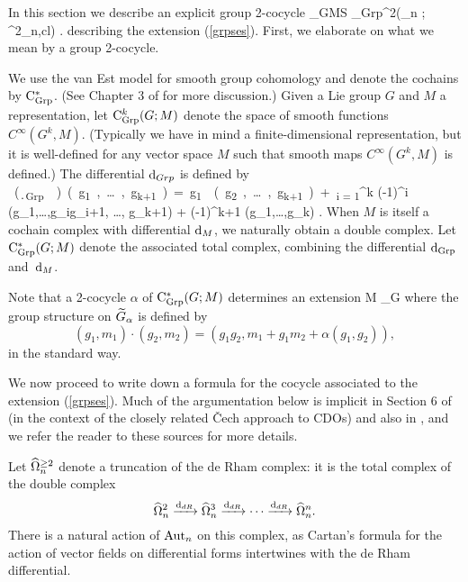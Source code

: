 
In this section we describe an explicit group 2-cocycle
\ben
\Tilde{\alpha}_{GMS} _{\rm Grp}^2(\Aut_n ; \hOmega^2_{n,cl}) .
\een
describing the extension (\ref{grpses}). First, we elaborate on what
we mean by a group 2-cocycle. 

We use the van Est model for smooth group cohomology and denote the cochains by ${\rm C}_{\rm Grp}^*$.
(See Chapter 3 of \cite{Fuks} for more discussion.) 
Given a Lie group $G$ and $M$ a representation,
let ${\rm C}_{\rm Grp}^k(G ; M)$ denote the space of smooth functions $C^\infty(G^k,M)$.
(Typically we have in mind a finite-dimensional representation,
but it is well-defined for any vector space $M$ such that smooth maps $C^\infty(G^k,M)$ is defined.)
The differential $\d_{Grp}$ is defined by
\si
\ben
(\d_{\rm Grp} \alpha)(g_1,\ldots, g_{k+1}) = 
g_1 \alpha(g_2, \ldots, g_{k+1}) + 
\sum_{i = 1}^{k} (-1)^i \alpha(g_1,\ldots,g_{i}g_{i+1}, \ldots, g_{k+1}) +
(-1)^{k+1} \alpha(g_1,\ldots,g_k) .
\een 
When $M$ is itself a cochain complex with differential $\d_M$, 
we naturally obtain a double complex.
Let ${\rm C}_{\rm Grp}^*(G; M)$ denote the associated total complex, combining the differential $\d_{\rm Grp}$ and~$\d_M$. 

Note that  a 2-cocycle $\alpha$ of ${\rm C}_{\rm Grp}^*(G; M)$ determines an extension
 \to M \to {}_\alpha \to G 
\een
where the group structure on $\Tilde{G}_\alpha$ is defined by
\[
(g_1, m_1) \cdot (g_2, m_2) = (g_1 g_2, m_1 + g_1m_2 + \alpha(g_1,g_2)),
\]
in the standard way.

We now proceed to write down a formula for the cocycle associated to the extension (\ref{grpses}). 
Much of the argumentation below is implicit in Section 6 of \cite{GMS2} (in the context of the closely related
\v{C}ech approach to CDOs) and also in \cite{GMS}, and we refer the reader to these sources for more details.  

Let $\hOmega^{\geq 2}_n$ denote a truncation of the de Rham complex: it is the total complex of the double complex
\[
\hOmega^{2}_n \xto{\d_{dR}} \hOmega^3_n \xto{\d_{dR}}\cdots \xto{\d_{dR}} \hOmega^n_n.
\]
There is a natural action of $\Aut_n$ on this complex, as Cartan's
formula for the action of vector fields on differential forms
intertwines with the de Rham differential. 

